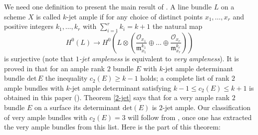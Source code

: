 \documentclass[a4paper]{amsart}
\theoremstyle{plain}
\theoremstyle{definition}
\begin{document}
We need one definition to present the main result of \cite{Takahashi}. A line bundle $L$ on a scheme $X$ is called $k$-jet ample if for any choice of distinct points $x_1, \dots, x_r$ and positive integers $k_1, \dots, k_r$ with $\sum_{i=1}^r k_i = k+1$ the natural map
\[
H^0(L) \to H^0\left(L \otimes \left(\frac{\mathcal O_{x_1}}{\mathfrak{m}_{x_1}^{k_1}} \oplus \dots \oplus \frac{\mathcal O_{x_r}}{\mathfrak{m}_{x_r}^{k_r}}\right)\right)
\]
is surjective (note that \textit{$1$-jet ampleness} is equivalent to \textit{very ampleness}).
It is proved in \cite{Takahashi} that for an ample rank $2$ bundle $E$ with $k$-jet ample determinant bundle $\mathrm{det}\, E$ the inequality $c_2(E) \geq k-1$ holds;
a complete list of rank $2$ ample bundles with $k$-jet ample determinant satisfying $k-1 \leq c_2(E) \leq k+1$ is obtained in this paper (\cite[Theorem 1.1]{Takahashi}).
Theorem \ref{2-jet} says that for a very ample rank $2$ bundle $E$ on a surface its determinant $\mathrm{det}(E)$ is $2$-jet ample.
Our classification of very ample bundles with $c_2(E) = 3$ will follow from \cite[Theorem 1.1]{Takahashi}, once one has extracted the very ample bundles from this list.
Here is the part of this theorem:
\end{document}
